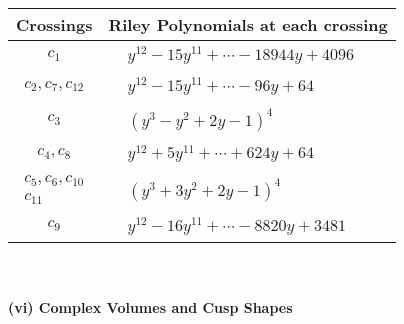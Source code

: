 \documentclass[1p]{elsarticle_modified}
\theoremstyle{definition}
\begin{document}
\begin{tabular}{m{50pt}|m{274pt}}
Crossings & \hspace{64pt}Riley Polynomials at each crossing \\
\hline $$\begin{aligned}c_{1}\end{aligned}$$&$\begin{aligned}
&y^{12}-15 y^{11}+\cdots-18944 y+4096
\end{aligned}$\\
\hline $$\begin{aligned}c_{2},c_{7},c_{12}\end{aligned}$$&$\begin{aligned}
&y^{12}-15 y^{11}+\cdots-96 y+64
\end{aligned}$\\
\hline $$\begin{aligned}c_{3}\end{aligned}$$&$\begin{aligned}
&(y^3- y^2+2 y-1)^4
\end{aligned}$\\
\hline $$\begin{aligned}c_{4},c_{8}\end{aligned}$$&$\begin{aligned}
&y^{12}+5 y^{11}+\cdots+624 y+64
\end{aligned}$\\
\hline $$\begin{aligned}c_{5},c_{6},c_{10}\\c_{11}\end{aligned}$$&$\begin{aligned}
&(y^3+3 y^2+2 y-1)^4
\end{aligned}$\\
\hline $$\begin{aligned}c_{9}\end{aligned}$$&$\begin{aligned}
&y^{12}-16 y^{11}+\cdots-8820 y+3481
\end{aligned}$\\
\hline
\end{tabular}\\~\\
\newpage\flushleft \textbf{(vi) Complex Volumes and Cusp Shapes}
\end{document}
